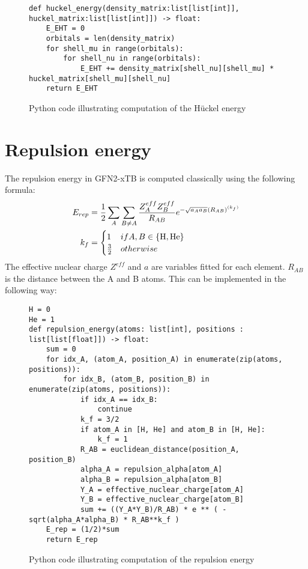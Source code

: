 \begin{figure}[H]
\begin{verbatim}
def huckel_energy(density_matrix:list[list[int]], huckel_matrix:list[list[int]]) -> float:
    E_EHT = 0
    orbitals = len(density_matrix)
    for shell_mu in range(orbitals):
        for shell_nu in range(orbitals):
            E_EHT += density_matrix[shell_nu][shell_mu] * huckel_matrix[shell_mu][shell_nu]
    return E_EHT
\end{verbatim}
\caption{Python code illustrating computation of the Hückel energy}
\end{figure}


\section{Repulsion energy}
The repulsion energy in GFN2-xTB is computed classically using the following formula:
\begin{align}
    \E{rep} &= \frac{1}{2}\sum_{A}\sum_{B\neq A}\frac{Z^{eff}_A Z^{eff}_B}{R_{AB}}e^{-\sqrt{a_Aa_B}(R_{AB})^{(k_f)}}\\
k_f &= \begin{cases}1 & if A,B\in\{\text{H},\text{He}\}\\\frac{3}{2}&otherwise\end{cases} 
\end{align}
The effective nuclear charge $Z^{eff}$ and $a$ are variables fitted for each element. 
$R_{AB}$ is the distance between the A and B atoms.
This can be implemented in the following way:

\begin{figure}[H]
\begin{verbatim}
H = 0
He = 1
def repulsion_energy(atoms: list[int], positions : list[list[float]]) -> float:
    sum = 0
    for idx_A, (atom_A, position_A) in enumerate(zip(atoms, positions)):
        for idx_B, (atom_B, position_B) in enumerate(zip(atoms, positions)):
            if idx_A == idx_B:
                continue
            k_f = 3/2
            if atom_A in [H, He] and atom_B in [H, He]:
                k_f = 1
            R_AB = euclidean_distance(position_A, position_B)
            alpha_A = repulsion_alpha[atom_A]
            alpha_B = repulsion_alpha[atom_B]
            Y_A = effective_nuclear_charge[atom_A]
            Y_B = effective_nuclear_charge[atom_B]
            sum += ((Y_A*Y_B)/R_AB) * e ** ( - sqrt(alpha_A*alpha_B) * R_AB**k_f )
    E_rep = (1/2)*sum
    return E_rep
\end{verbatim}
\caption{Python code illustrating computation of the repulsion energy}
\end{figure}

